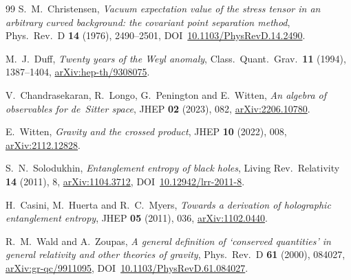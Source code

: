 \documentclass[11pt]{article}
\begin{document}
\begin{thebibliography}{99}
S.~M.\ Christensen,
\emph{Vacuum expectation value of the stress tensor in an arbitrary
curved background:  the covariant point separation method},
Phys.\ Rev.\ D \textbf{14} (1976), 2490--2501,
DOI~\href{https://doi.org/10.1103/PhysRevD.14.2490}{10.1103/PhysRevD.14.2490}.

M.~J.\ Duff,
\emph{Twenty years of the Weyl anomaly},
Class.\ Quant.\ Grav.\ \textbf{11} (1994), 1387--1404,
\href{https://arxiv.org/abs/hep-th/9308075}{arXiv:hep-th/9308075}.

V.\ Chandrasekaran, R.\ Longo, G.\ Penington and E.\ Witten,
\emph{An algebra of observables for de~Sitter space},
JHEP \textbf{02} (2023), 082,
\href{https://arxiv.org/abs/2206.10780}{arXiv:2206.10780}.

E.\ Witten,
\emph{Gravity and the crossed product},
JHEP \textbf{10} (2022), 008,
\href{https://arxiv.org/abs/2112.12828}{arXiv:2112.12828}.

S.~N.\ Solodukhin,
\emph{Entanglement entropy of black holes},
Living Rev.\ Relativity \textbf{14} (2011), 8,
\href{https://arxiv.org/abs/1104.3712}{arXiv:1104.3712},
DOI~\href{https://doi.org/10.12942/lrr-2011-8}{10.12942/lrr-2011-8}.

H.\ Casini, M.\ Huerta and R.~C.\ Myers,
\emph{Towards a derivation of holographic entanglement entropy},
JHEP \textbf{05} (2011), 036,
\href{https://arxiv.org/abs/1102.0440}{arXiv:1102.0440}.

R.~M.\ Wald and A.\ Zoupas,
\emph{A general definition of `conserved quantities' in general
relativity and other theories of gravity},
Phys.\ Rev.\ D \textbf{61} (2000), 084027,
\href{https://arxiv.org/abs/gr-qc/9911095}{arXiv:gr-qc/9911095},
DOI~\href{https://doi.org/10.1103/PhysRevD.61.084027}{10.1103/PhysRevD.61.084027}.

\end{thebibliography}
\end{document}
